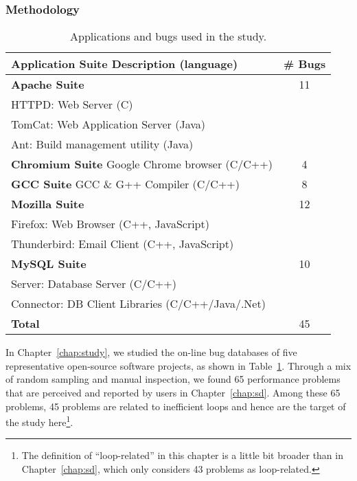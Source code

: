 \subsubsection{Methodology}
\begin{table}[h!]
\scriptsize
\centering
\begin{tabular}{@{\hspace{3pt}}l@{\hspace{3pt}}@{\hspace{3pt}}c@{\hspace{3pt}}}
\toprule
Application Suite Description (language) & \# Bugs \\
\midrule                            
{\bf Apache Suite} 	 & 11\\
{HTTPD:	Web Server (C)	}& \\
{TomCat:  Web Application Server (Java)}& \\
{Ant:	Build management utility (Java)}& \\
\midrule                            
{\bf Chromium Suite} Google Chrome browser (C/C++) & 4\\
\midrule
{\bf GCC Suite}  GCC \& G++ Compiler (C/C++)     & 8\\
\midrule
{\bf Mozilla Suite}  & 12\\
{Firefox: Web Browser (C++, JavaScript)}& 	\\
{Thunderbird: Email Client (C++, JavaScript)}& \\
\midrule
{\bf MySQL Suite}     & 10	\\
{Server: Database Server (C/C++)}&  	\\
{Connector: DB Client Libraries (C/C++/Java/.Net)} &  	\\
\midrule
{\bf Total}	   & 45 \\
\bottomrule
\end{tabular}
\caption{Applications and bugs used in the study.}
\label{tab:6_app_bug}
\end{table}

In Chapter~\ref{chap:study}, we studied the on-line bug
databases of five representative open-source software projects, as 
shown in Table~\ref{tab:6_app_bug}. 
Through a mix of random sampling and 
manual inspection, we
found 65 performance problems that are perceived and reported by users in Chapter~\ref{chap:sd}. 
Among these 65 problems, 45 problems are related to inefficient loops and 
hence are the target of the study 
here\footnote{The definition of ``loop-related'' in this chapter is a little
bit broader than in Chapter~\ref{chap:sd}, which only considers
43 problems as loop-related. }.

